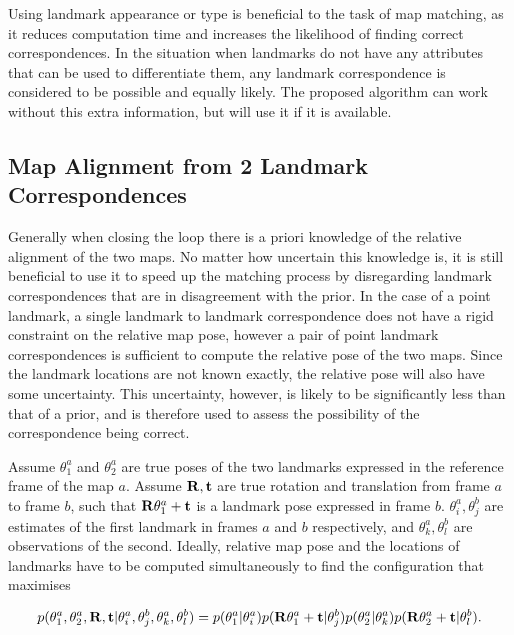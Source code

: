 Using landmark appearance or type is beneficial to the task of map
matching, as it reduces computation time and increases the likelihood
of finding correct correspondences. In the situation when landmarks do
not have any attributes that can be used to differentiate them, any
landmark correspondence is considered to be possible and equally
likely. The proposed algorithm can work without this extra
information, but will use it if it is available.

\subsection{Map Alignment from 2 Landmark Correspondences}

Generally when closing the loop there is a priori knowledge of the
relative alignment of the two maps. No matter how uncertain this
knowledge is, it is still beneficial to use it to speed up the
matching process by disregarding landmark correspondences that are in
disagreement with the prior. In the case of a point landmark, a single
landmark to landmark correspondence does not have a rigid constraint
on the relative map pose, however a pair of point landmark
correspondences is sufficient to compute the relative pose of the two
maps. Since the landmark locations are not known exactly, the relative
pose will also have some uncertainty. This uncertainty, however, is
likely to be significantly less than that of a prior, and is therefore
used to assess the possibility of the correspondence being
correct.

Assume $\theta^a_1$ and $\theta^a_2$ are true poses of the two
landmarks expressed in the reference frame of the map $a$. Assume
${\bf R,t}$ are true rotation and translation from frame $a$ to frame
$b$, such that ${\bf R}\theta_1^a + \bf{t}$ is a landmark pose expressed
in frame $b$. $\theta^a_i, \theta^b_j$ are estimates of the first
landmark in frames $a$ and $b$ respectively, and $\theta^a_k,
\theta^b_l$ are observations of the second. Ideally, relative map
pose and the locations of landmarks have to be computed
simultaneously to find the configuration that maximises

\begin{equation}
p(\theta^a_1, \theta^a_2, {\bf R},{\bf t}|
  \theta^a_i, \theta^b_j, \theta^a_k, \theta^b_l) =
p(\theta^a_1 | \theta^a_i)
p({\bf R}\theta^a_1+{\bf t} | \theta^b_j)
p(\theta^a_2 | \theta^a_k)
p({\bf R}\theta^a_2+{\bf t} | \theta^b_l).
\label{eqn:true_alignment_prob}
\end{equation}

